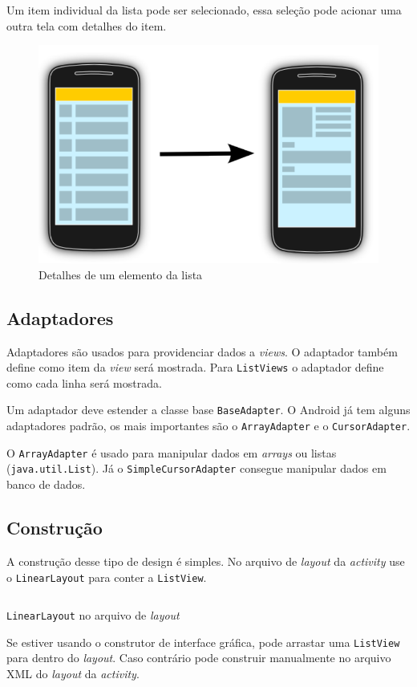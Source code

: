 \documentclass[a4paper,12pt,brazil,oneside]{book}
\begin{document}
Um item individual da lista pode ser selecionado, essa seleção pode acionar uma outra tela com detalhes do item.


\begin{figure}[H]
  \centering
  \includegraphics[width=.45\textwidth]{figuras/design/listview-scheme2.png}
  \caption{Detalhes de um elemento da lista}
  \label{fig:e9}
\end{figure}

\subsection{Adaptadores}
	Adaptadores são usados para providenciar dados a \emph{views}. O adaptador também define como item da \emph{view} será mostrada. Para \texttt{ListViews} o adaptador define como cada linha será mostrada.
	
	Um adaptador deve estender a classe base \texttt{BaseAdapter}. O Android já tem alguns adaptadores padrão, os mais importantes são o \texttt{ArrayAdapter} e o \texttt{CursorAdapter}. 
	
	O \texttt{ArrayAdapter} é usado para manipular dados em \emph{arrays} ou listas (\texttt{java.util.List}). Já o \texttt{SimpleCursorAdapter} consegue manipular dados em banco de dados.

\subsection{Construção}

A construção desse tipo de design é simples. No arquivo de \emph{layout} da \emph{activity} use o \texttt{LinearLayout} para conter a \texttt{ListView}.

\begin{listing}[H]
\inputminted[linenos=true,fontsize=\small,frame=lines, framesep=2mm, tabsize=2,numbersep=5pt]{xml}{src/design/layout_linear.xml}
\caption{\texttt{LinearLayout} no arquivo de \emph{layout}}
\label{code:linearlayout}
\end{listing}

Se estiver usando o construtor de interface gráfica, pode arrastar uma \texttt{ListView} para dentro do \emph{layout}. Caso contrário pode construir manualmente no arquivo XML do \emph{layout} da \emph{activity}. 
\end{document}
